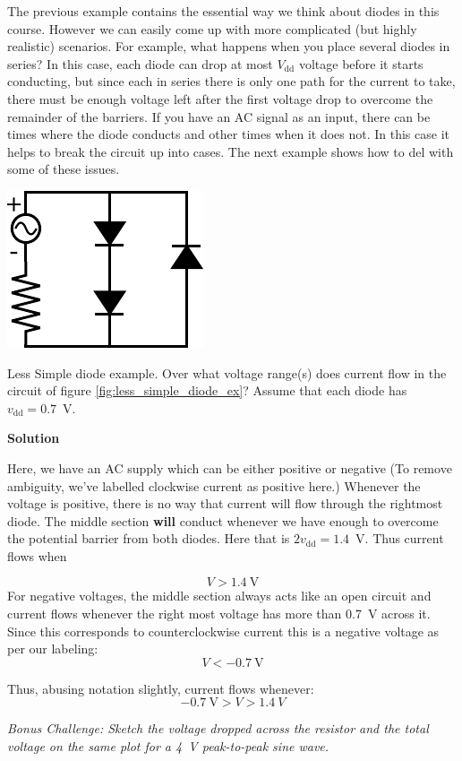 \documentclass{tufte-book}
\newcommand\Solution{\par\textbf{\textsf{Solution}}\par\medskip}
\begin{document}
The previous example contains the essential way we think about diodes in this course. However we can easily come up with more complicated (but highly realistic) scenarios. For example, what happens when you place several diodes in series? In this case, each diode can drop at most $V_\text{dd}$ voltage before it starts conducting, but since each in series there is only one path for the current to take, there must be enough voltage left after the first voltage drop to overcome the remainder of the barriers. If you have an AC signal as an input, there can be times where the diode conducts and other times when it does not. In this case it helps to break the circuit up into cases. The next example shows how to del with some of these issues.


\begin{marginfigure}
  \includegraphics[]{less_simple_diode_ex}
  \caption{Less simple diode example.}
  \label{fig:less_simple_diode_ex}
\end{marginfigure}

\begin{myexample}[label = ex:less_simple_diode]{Less Simple diode example.}
Over what voltage range(s) does current flow in the circuit of figure \ref{fig:less_simple_diode_ex}? Assume that each diode has $v_\text{dd} = 0.7$~V.
\Solution
Here, we have an AC supply which can be either positive or negative (To remove ambiguity, we've labelled clockwise current as positive here.) Whenever the voltage is positive, there is no way that current will flow through the rightmost diode. The middle section \textbf{will} conduct whenever we have enough to overcome the potential barrier from both diodes. Here that is $2v_\text{dd} = 1.4$~V. Thus current flows when 

$$
V>1.4~\text{V}
$$
For negative voltages, the middle section always acts like an open circuit and current flows whenever the right most voltage has more than 0.7~V across it. Since this corresponds to counterclockwise current this is a negative voltage as per our labeling:
$$
V<-0.7~\text{V}
$$

Thus, abusing notation slightly, current flows whenever:
$$
-0.7~\text{V} > V > 1.4~V
$$

\textit{Bonus Challenge: Sketch the voltage dropped across the resistor and the total voltage on the same plot for a 4~V peak-to-peak sine wave.}
\end{myexample}
\end{document}
